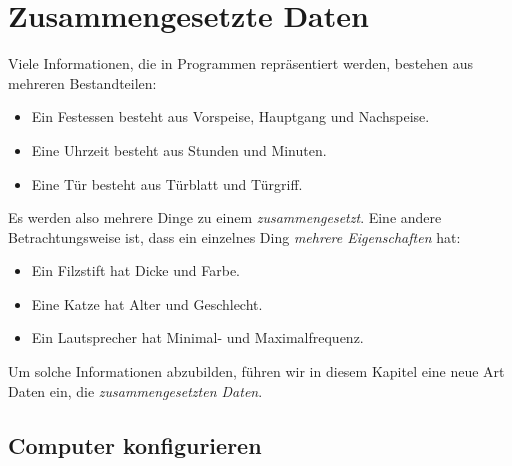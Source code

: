 
\chapter{Zusammengesetzte Daten}
\label{cha:zusammengesetzte-daten}

Viele Informationen, die in Programmen repräsentiert werden, bestehen
aus mehreren Bestandteilen:
%
\begin{itemize}
\item Ein Festessen besteht aus Vorspeise, Hauptgang und Nachspeise.
\item Eine Uhrzeit besteht aus Stunden und Minuten.
\item Eine Tür besteht aus Türblatt und Türgriff.
\end{itemize}
%
Es werden also mehrere Dinge zu einem \textit{zusammengesetzt}.
Eine andere Betrachtungsweise ist, dass ein einzelnes
Ding \textit{mehrere Eigenschaften} hat:
%
\begin{itemize}
\item Ein Filzstift hat Dicke und Farbe.
\item Eine Katze hat Alter und Geschlecht.
\item Ein Lautsprecher hat Minimal- und Maximalfrequenz.
\end{itemize}
%
Um solche Informationen abzubilden, führen wir in diesem Kapitel eine neue Art
Daten ein, die \textit{zusammengesetzten
  Daten}.

\section{Computer konfigurieren}
\label{sec:computer-konfigurieren}

